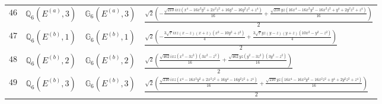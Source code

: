 \documentclass[fleqn,8pt,landscape]{jsarticle}
\begin{document}
\begin{table}[ht!]
\begin{center}
\begin{tabular}{cccl}
$ 46 $ & $ \mathbb{Q}_{6}(E^{(a)},3) $ & $ \mathbb{G}_{6}(E^{(a)},3) $ & $ \frac{\sqrt{2} \left(- \frac{\sqrt{210} i x z \left(x^{4} - 16 x^{2} y^{2} + 2 x^{2} z^{2} + 16 y^{4} - 16 y^{2} z^{2} + z^{4}\right)}{16} + \frac{\sqrt{210} y z \left(16 x^{4} - 16 x^{2} y^{2} - 16 x^{2} z^{2} + y^{4} + 2 y^{2} z^{2} + z^{4}\right)}{16}\right)}{2} $ \\
$ 47 $ & $ \mathbb{Q}_{6}(E^{(b)},1) $ & $ \mathbb{G}_{6}(E^{(b)},1) $ & $ \frac{\sqrt{2} \left(- \frac{3 \sqrt{7} i x z \left(x - z\right) \left(x + z\right) \left(x^{2} - 10 y^{2} + z^{2}\right)}{4} + \frac{3 \sqrt{7} y z \left(y - z\right) \left(y + z\right) \left(10 x^{2} - y^{2} - z^{2}\right)}{4}\right)}{2} $ \\
$ 48 $ & $ \mathbb{Q}_{6}(E^{(b)},2) $ & $ \mathbb{G}_{6}(E^{(b)},2) $ & $ \frac{\sqrt{2} \left(\frac{\sqrt{462} i x z \left(x^{2} - 3 z^{2}\right) \left(3 x^{2} - z^{2}\right)}{16} + \frac{\sqrt{462} y z \left(y^{2} - 3 z^{2}\right) \left(3 y^{2} - z^{2}\right)}{16}\right)}{2} $ \\
$ 49 $ & $ \mathbb{Q}_{6}(E^{(b)},3) $ & $ \mathbb{G}_{6}(E^{(b)},3) $ & $ \frac{\sqrt{2} \left(\frac{\sqrt{210} i x z \left(x^{4} - 16 x^{2} y^{2} + 2 x^{2} z^{2} + 16 y^{4} - 16 y^{2} z^{2} + z^{4}\right)}{16} + \frac{\sqrt{210} y z \left(16 x^{4} - 16 x^{2} y^{2} - 16 x^{2} z^{2} + y^{4} + 2 y^{2} z^{2} + z^{4}\right)}{16}\right)}{2} $ \\
 \hline \hline
\end{tabular}
\end{center}
\end{table}
\end{document}
